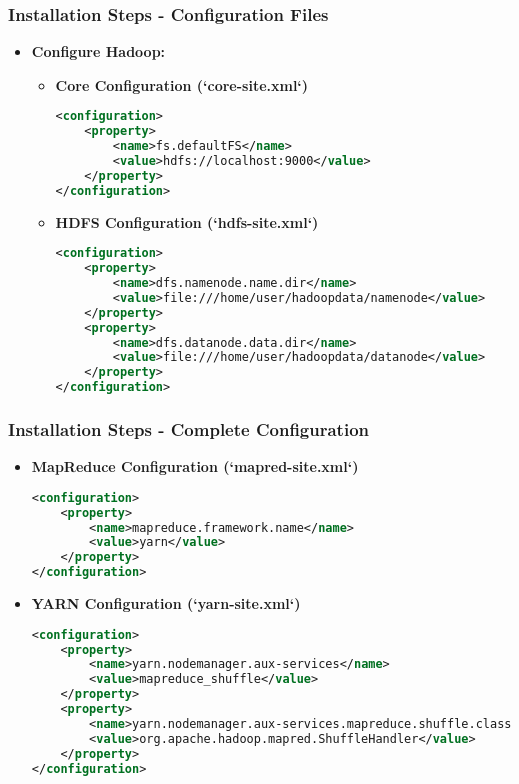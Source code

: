 \documentclass[aspectratio=169]{beamer}
\begin{document}
\begin{frame}[fragile]
    \frametitle{Installation Steps - Configuration Files}
    \begin{itemize}
        \item \textbf{Configure Hadoop:}
        \begin{itemize}
            \item \textbf{Core Configuration (`core-site.xml`)}
            \begin{lstlisting}[language=XML]
<configuration>
    <property>
        <name>fs.defaultFS</name>
        <value>hdfs://localhost:9000</value>
    </property>
</configuration>
            \end{lstlisting}

            \item \textbf{HDFS Configuration (`hdfs-site.xml`)}
            \begin{lstlisting}[language=XML]
<configuration>
    <property>
        <name>dfs.namenode.name.dir</name>
        <value>file:///home/user/hadoopdata/namenode</value>
    </property>
    <property>
        <name>dfs.datanode.data.dir</name>
        <value>file:///home/user/hadoopdata/datanode</value>
    </property>
</configuration>
            \end{lstlisting}
        \end{itemize}
    \end{itemize}
\end{frame}

\begin{frame}[fragile]
    \frametitle{Installation Steps - Complete Configuration}
    \begin{itemize}
        \item \textbf{MapReduce Configuration (`mapred-site.xml`)}
        \begin{lstlisting}[language=XML]
<configuration>
    <property>
        <name>mapreduce.framework.name</name>
        <value>yarn</value>
    </property>
</configuration>
        \end{lstlisting}
        \item \textbf{YARN Configuration (`yarn-site.xml`)}
        \begin{lstlisting}[language=XML]
<configuration>
    <property>
        <name>yarn.nodemanager.aux-services</name>
        <value>mapreduce_shuffle</value>
    </property>
    <property>
        <name>yarn.nodemanager.aux-services.mapreduce.shuffle.class</name>
        <value>org.apache.hadoop.mapred.ShuffleHandler</value>
    </property>
</configuration>
        \end{lstlisting}
    \end{itemize}
\end{frame}
\end{document}
